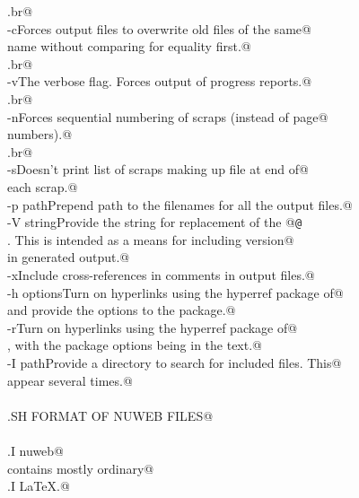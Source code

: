 \documentclass[a4paper]{report}
\begin{document}
\begin{flushleft}
\begin{list}{}{}
\mbox{}\verb@.br@\\
\mbox{}\verb@\fB-c\fP Forces output files to overwrite old files of the same@\\
\mbox{}\verb@  name without comparing for equality first.@\\
\mbox{}\verb@.br@\\
\mbox{}\verb@\fB-v\fP The verbose flag. Forces output of progress reports.@\\
\mbox{}\verb@.br@\\
\mbox{}\verb@\fB-n\fP Forces sequential numbering of scraps (instead of page@\\
\mbox{}\verb@  numbers).@\\
\mbox{}\verb@.br@\\
\mbox{}\verb@\fB-s\fP Doesn't print list of scraps making up file at end of@\\
\mbox{}\verb@  each scrap.@\\
\mbox{}\verb@\fB-p path\fP Prepend path to the filenames for all the output files.@\\
\mbox{}\verb@\fB-V string\fP Provide the string for replacement of the @{\tt @}\verb@v@\\
\mbox{}\verb@operation. This is intended as a means for including version@\\
\mbox{}\verb@information in generated output.@\\
\mbox{}\verb@\fB-x\fP Include cross-references in comments in output files.@\\
\mbox{}\verb@\fB-h options\fP Turn on hyperlinks using the hyperref package of@\\
\mbox{}\verb@LaTeX and provide the options to the package.@\\
\mbox{}\verb@\fB-r\fP Turn on hyperlinks using the hyperref package of@\\
\mbox{}\verb@LaTeX, with the package options being in the text.@\\
\mbox{}\verb@\fB-I path\fP Provide a directory to search for included files. This@\\
\mbox{}\verb@may appear several times.@\\
\mbox{}\verb@@\\
\mbox{}\verb@.SH FORMAT OF NUWEB FILES@\\
\mbox{}\verb@A@\\
\mbox{}\verb@.I nuweb@\\
\mbox{}\verb@file contains mostly ordinary@\\
\mbox{}\verb@.I LaTeX.@\\

\end{list}
\end{flushleft}
\end{document}
